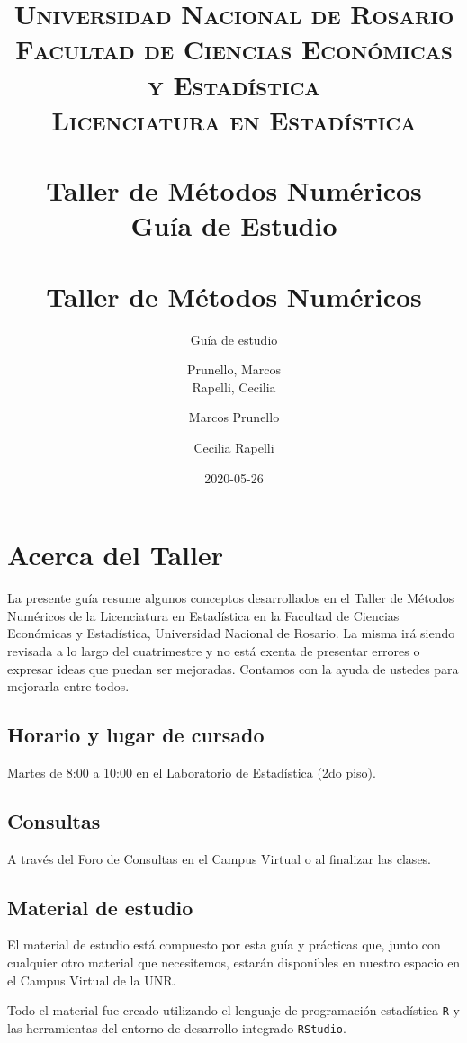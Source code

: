 \documentclass[openany]{book}
\title{
	\usefont{OT1}{bch}{b}{n}
	\normalfont \normalsize
	\textsc{
		Universidad Nacional de Rosario \\
		Facultad de Ciencias Económicas y Estadística \\
		Licenciatura en Estadística
	} \\ [25pt]
	\horrule{2pt} \\[0.4cm]
	\huge \textbf{Taller de Métodos Numéricos} \\
	\bigbreak
	Guía de Estudio\\
	\horrule{2pt} \\[0.5cm]}
\author{
	\normalfont Prunello, Marcos \\
	\normalfont Rapelli, Cecilia
}
\title{Taller de Métodos Numéricos}
\subtitle{Guía de estudio}
\author{Marcos Prunello \and Cecilia Rapelli}
\date{2020-05-26}
\begin{document}
\maketitle

{
\setcounter{tocdepth}{1}
\tableofcontents
}
\hypertarget{acerca-del-taller}{%
\chapter*{Acerca del Taller}\label{acerca-del-taller}}

La presente guía resume algunos conceptos desarrollados en el Taller de Métodos Numéricos de la Licenciatura en Estadística en la Facultad de Ciencias Económicas y Estadística, Universidad Nacional de Rosario. La misma irá siendo revisada a lo largo del cuatrimestre y no está exenta de presentar errores o expresar ideas que puedan ser mejoradas. Contamos con la ayuda de ustedes para mejorarla entre todos.

\hypertarget{horario-y-lugar-de-cursado}{%
\section*{Horario y lugar de cursado}\label{horario-y-lugar-de-cursado}}

Martes de 8:00 a 10:00 en el Laboratorio de Estadística (2do piso).

\hypertarget{consultas}{%
\section*{Consultas}\label{consultas}}

A través del Foro de Consultas en el Campus Virtual o al finalizar las clases.

\hypertarget{material-de-estudio}{%
\section*{Material de estudio}\label{material-de-estudio}}

El material de estudio está compuesto por esta guía y prácticas que, junto con cualquier otro material que necesitemos, estarán disponibles en nuestro espacio en el Campus Virtual de la UNR.

Todo el material fue creado utilizando el lenguaje de programación estadística \texttt{R} y las herramientas del entorno de desarrollo integrado \texttt{RStudio}.
\end{document}
